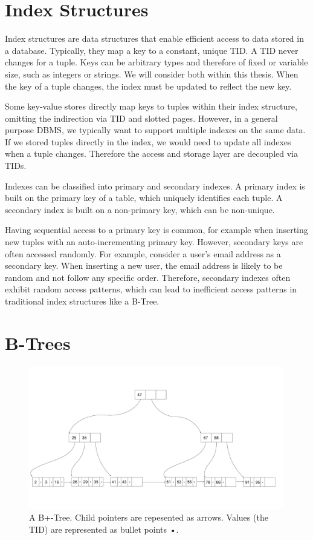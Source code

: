 \section{Index Structures}
Index structures are data structures that enable efficient access to data stored in a database.
Typically, they map a key to a constant, unique \ac{TID}. A \ac{TID} never changes for a tuple.
Keys can be arbitrary types and therefore of fixed or variable size, such as integers or strings.
We will consider both within this thesis.
When the key of a tuple changes, the index must be updated to reflect the new key.

Some key-value stores directly map keys to tuples within their index structure, omitting the indirection via \ac{TID} and slotted pages.
However, in a general purpose \ac{DBMS}, we typically want to support multiple indexes on the same data.
If we stored tuples directly in the index, we would need to update all indexes when a tuple changes.
Therefore the access and storage layer are decoupled via \ac{TID}s.

Indexes can be classified into primary and secondary indexes.
A primary index is built on the primary key of a table, which uniquely identifies each tuple.
A secondary index is built on a non-primary key, which can be non-unique.

Having sequential access to a primary key is common, for example when inserting new tuples with an auto-incrementing primary key.
However, secondary keys are often accessed randomly. For example, consider a user's email address as a secondary key.
When inserting a new user, the email address is likely to be random and not follow any specific order.
Therefore, secondary indexes often exhibit random access patterns, which can lead to inefficient access patterns in traditional index structures like a B-Tree.

\section{B-Trees}

\begin{figure}[htpb]
  \centering
  \includegraphics[width=0.99\textwidth]{figures/b_tree.pdf}
  \caption{A B+-Tree. Child pointers are repesented as arrows. Values (the \ac{TID}) are represented as bullet points •.}
  \label{fig:b-tree}
\end{figure}


